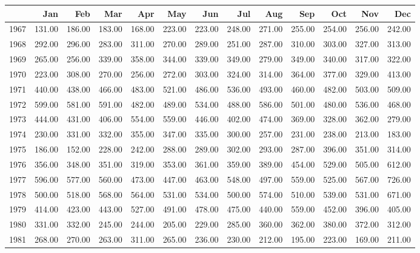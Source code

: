 \begin{longtable}{rrrrrrrrrrrrr}
  \hline
 & Jan & Feb & Mar & Apr & May & Jun & Jul & Aug & Sep & Oct & Nov & Dec \\ 
  \hline
1967 & 131.00 & 186.00 & 183.00 & 168.00 & 223.00 & 223.00 & 248.00 & 271.00 & 255.00 & 254.00 & 256.00 & 242.00 \\ 
  1968 & 292.00 & 296.00 & 283.00 & 311.00 & 270.00 & 289.00 & 251.00 & 287.00 & 310.00 & 303.00 & 327.00 & 313.00 \\ 
  1969 & 265.00 & 256.00 & 339.00 & 358.00 & 344.00 & 339.00 & 349.00 & 279.00 & 349.00 & 340.00 & 317.00 & 322.00 \\ 
  1970 & 223.00 & 308.00 & 270.00 & 256.00 & 272.00 & 303.00 & 324.00 & 314.00 & 364.00 & 377.00 & 329.00 & 413.00 \\ 
  1971 & 440.00 & 438.00 & 466.00 & 483.00 & 521.00 & 486.00 & 536.00 & 493.00 & 460.00 & 482.00 & 503.00 & 509.00 \\ 
  1972 & 599.00 & 581.00 & 591.00 & 482.00 & 489.00 & 534.00 & 488.00 & 586.00 & 501.00 & 480.00 & 536.00 & 468.00 \\ 
  1973 & 444.00 & 431.00 & 406.00 & 554.00 & 559.00 & 446.00 & 402.00 & 474.00 & 369.00 & 328.00 & 362.00 & 279.00 \\ 
  1974 & 230.00 & 331.00 & 332.00 & 355.00 & 347.00 & 335.00 & 300.00 & 257.00 & 231.00 & 238.00 & 213.00 & 183.00 \\ 
  1975 & 186.00 & 152.00 & 228.00 & 242.00 & 288.00 & 289.00 & 302.00 & 293.00 & 287.00 & 396.00 & 351.00 & 314.00 \\ 
  1976 & 356.00 & 348.00 & 351.00 & 319.00 & 353.00 & 361.00 & 359.00 & 389.00 & 454.00 & 529.00 & 505.00 & 612.00 \\ 
  1977 & 596.00 & 577.00 & 560.00 & 473.00 & 447.00 & 463.00 & 548.00 & 497.00 & 559.00 & 525.00 & 567.00 & 726.00 \\ 
  1978 & 500.00 & 518.00 & 568.00 & 564.00 & 531.00 & 534.00 & 500.00 & 574.00 & 510.00 & 539.00 & 531.00 & 671.00 \\ 
  1979 & 414.00 & 423.00 & 443.00 & 527.00 & 491.00 & 478.00 & 475.00 & 440.00 & 559.00 & 452.00 & 396.00 & 405.00 \\ 
  1980 & 331.00 & 332.00 & 245.00 & 244.00 & 205.00 & 229.00 & 285.00 & 360.00 & 362.00 & 380.00 & 372.00 & 312.00 \\ 
  1981 & 268.00 & 270.00 & 263.00 & 311.00 & 265.00 & 236.00 & 230.00 & 212.00 & 195.00 & 223.00 & 169.00 & 211.00 \\ 

\end{longtable}
